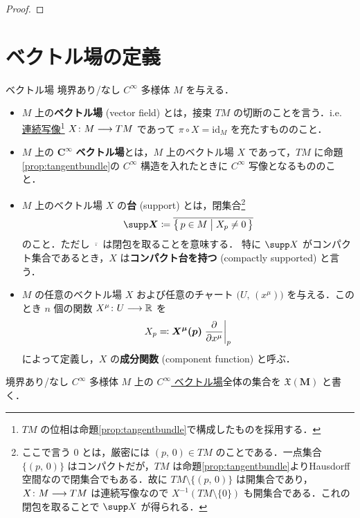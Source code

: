 \documentclass[TQFT_main]{subfiles}
\begin{document}
\begin{proof}

\end{proof}

\section{ベクトル場の定義}

\begin{mydef}[label=def:vecf, breakable]{ベクトル場}
    境界あり/なし $C^\infty$ 多様体 $M$ を与える．
    \begin{itemize}
        \item $M$ 上の\textbf{ベクトル場} (vector field) とは，接束 $TM$ の切断のことを言う．i.e. \underline{連続写像}\footnote{$TM$ の位相は命題\ref{prop:tangentbundle}で構成したものを採用する．} $X \colon M \longrightarrow TM$ であって $\pi \circ X = \mathrm{id}_M$ を充たすもののこと．
        \item $M$ 上の $\bm{C^\infty}$ \textbf{ベクトル場}とは，$M$ 上のベクトル場 $X$ であって，$TM$ に命題\ref{prop:tangentbundle}の $C^\infty$ 構造を入れたときに $C^\infty$ 写像となるもののこと．
        \item $M$ 上のベクトル場 $X$ の\textbf{台} (support) とは，閉集合\footnote{ここで言う $0$ とは，厳密には $(p,\, 0) \in TM$ のことである．一点集合 $\{(p,\, 0) \}$ はコンパクトだが，$T M$ は命題\ref{prop:tangentbundle}よりHausdorff空間なので閉集合でもある．故に $T M \setminus \{(p,\, 0) \}$ は開集合であり，$X \colon M \longrightarrow TM$ は連続写像なので $X^{-1}(TM \setminus \{0\})$ も開集合である．これの閉包を取ることで $\supp X$ が得られる．}
        \begin{align}
            \bm{\supp X} \coloneqq \overline{\bigl\{\, p \in M \bigm| X_p \neq 0 \,\bigr\} }
        \end{align}
        のこと．ただし $\overline{\cdot}$ は閉包を取ることを意味する．
        特に $\supp X$ がコンパクト集合であるとき，$X$ は\textbf{コンパクト台を持つ} (compactly supported) と言う．
        \item $M$ の任意のベクトル場 $X$ および任意のチャート $\bigl(U,\, (x^\mu)\bigr)$ を与える．このとき $n$ 個の関数 $X^\mu \colon U \longrightarrow \mathbb{R}$ を
        \begin{align}
            X_p \eqqcolon \bm{X^\mu (p)} \eval{\pdv{}{x^\mu}}_p
        \end{align}
        によって定義し，$X$ の\textbf{成分関数} (component function) と呼ぶ．
    \end{itemize}
    \tcblower
    境界あり/なし $C^\infty$ 多様体 $M$ 上の \underline{$C^\infty$ ベクトル場}全体の集合を $\bm{\mathfrak{X}(M)}$ と書く．
\end{mydef}
\end{document}
